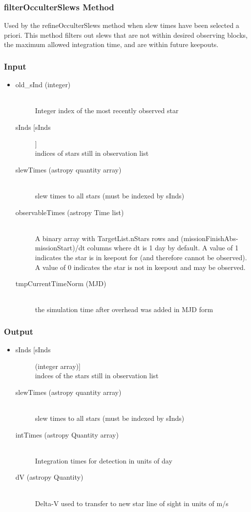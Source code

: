 \documentclass[cleanfoot]{asme2ej}
\begin{document}
\subsubsection{filterOcculterSlews Method} \label{sec:refineOcculterSlewstask}
Used by the refineOcculterSlews method when slew times have been selected a priori. This method filters out slews that are not within desired observing blocks, the maximum allowed integration time, and are within future keepouts.
\subsubsection*{Input}
\begin{itemize}
\item
\begin{description}
    \item[old\_sInd (integer)] \hfill \\ Integer index of the most recently observed star
    \item[sInds [sInds]] \hfill \\ indices of stars still in observation list
    \item[slewTimes (astropy quantity array)] \hfill \\ slew times to all stars (must be indexed by sInds)
    \item[observableTimes (astropy Time list)] \hfill \\ A binary array with TargetList.nStars rows and (missionFinishAbs-missionStart)/dt columns where dt is 1 day by default. A value of 1 indicates the star is in keepout for (and therefore cannot be observed). A value of 0 indicates the star is not in keepout and may be observed.
    \item[tmpCurrentTimeNorm (MJD)] \hfill \\ the simulation time after overhead was added in MJD form
\end{description}
\end{itemize}
\subsubsection*{Output}
\begin{itemize}
\item
\begin{description}
    \item[sInds [sInds] (integer array)] \hfill \\ indces of the stars still in observation list
    \item[slewTimes (astropy quantity array)] \hfill \\ slew times to all stars (must be indexed by sInds)
    \item[intTimes (astropy Quantity array)] \hfill \\ Integration times for detection in units of day
    \item[dV (astropy Quantity)] \hfill \\ Delta-V used to transfer to new star line of sight in units of m/s
    
\end{description}
\end{itemize}
\end{document}
